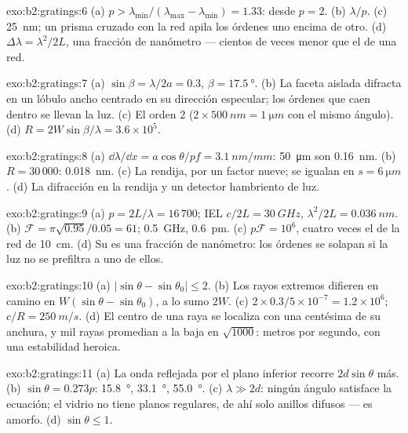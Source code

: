 \begin{solution}{exo:b2:gratings:6}
(a) $p > \lambda_{\min}/(\lambda_{\max} - \lambda_{\min}) = 1.33$: desde $p = 2$. (b) $\lambda/p$. (c)
\qty{25}{nm}; un prisma cruzado con la red apila los órdenes uno encima
de otro. (d) $\Delta\lambda = \lambda^2/2L$, una fracción de nanómetro --- cientos
de veces menor que el de una red.
\end{solution}

\begin{solution}{exo:b2:gratings:7}
(a) $\sin\beta = \lambda/2a = 0.3$, $\beta = \qty{17.5}{\degree}$. (b) La faceta aislada difracta
en un lóbulo ancho centrado en su dirección especular; los órdenes que
caen dentro se llevan la luz. (c) El orden 2 ($2 \times \qty{500}{nm} = \qty{1}{\micro m}$ con
el mismo ángulo). (d) $R = 2W\sin\beta/\lambda = 3.6 \times 10^5$.
\end{solution}

\begin{solution}{exo:b2:gratings:8}
(a) $\dd\lambda/\dd x = a\cos\theta/pf = \qty{3.1}{nm/mm}$: \qty{50}{\micro m} son \qty{0.16}{nm}. (b)
$R = 30\,000$: \qty{0.018}{nm}. (c) La rendija, por un factor nueve; se igualan en $s = \qty{6}{\micro m}$.
(d) La difracción en la rendija y un detector hambriento de luz.
\end{solution}

\begin{solution}{exo:b2:gratings:9}
(a) $p = 2L/\lambda = 16\,700$; IEL $c/2L = \qty{30}{GHz}$, $\lambda^2/2L = \qty{0.036}{nm}$. (b) $\mathcal F
= \pi\sqrt{0.95}/0.05 = 61$; \qty{0.5}{GHz}, \qty{0.6}{pm}. (c) $p\mathcal F = 10^6$, cuatro
veces el de la red de \qty{10}{cm}. (d) Su  es una fracción
de nanómetro: los órdenes se solapan si la luz no se prefiltra
a uno de ellos.
\end{solution}

\begin{solution}{exo:b2:gratings:10}
(a) $|\sin\theta - \sin\theta_0| \le 2$. (b) Los rayos extremos difieren en camino en
$W(\sin\theta - \sin\theta_0)$, a lo sumo $2W$. (c) $2 \times 0.3/5 \times 10^{-7} = 1.2 \times 10^6$; $c/R
= \qty{250}{m/s}$. (d) El centro de una raya se localiza con una centésima de su
anchura, y mil rayas promedian a la baja en $\sqrt{1000}$: metros por
segundo, con una estabilidad heroica.
\end{solution}

\begin{solution}{exo:b2:gratings:11}
(a) La onda reflejada por el plano inferior recorre $2d\sin\theta$ más.
(b) $\sin\theta = 0.273p$: \qty{15.8}{\degree}, \qty{33.1}{\degree}, \qty{55.0}{\degree}. (c) $\lambda \gg 2d$:
ningún ángulo satisface la ecuación; el vidrio no tiene planos regulares, de ahí
solo anillos difusos --- es amorfo. (d) $\sin\theta \le 1$.
\end{solution}

